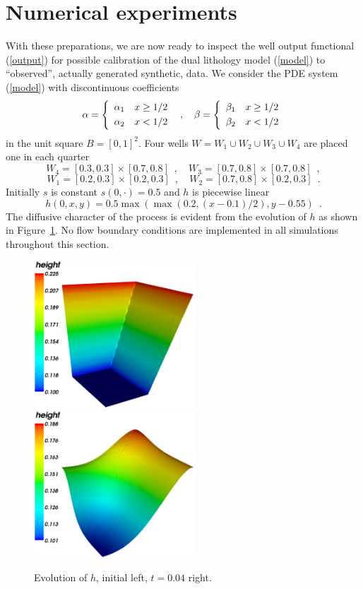 \section{Numerical experiments}

With these preparations, we are now ready to inspect the well output functional (\ref{output})
for possible calibration of the dual lithology model (\ref{model}) to ``observed'',
actually generated synthetic, data.
We consider the PDE system (\ref{model}) with discontinuous coefficients
$$
 \alpha = \left\{
 \begin{array}{rl} \alpha_1 & x \ge 1/2 \\[\jot] \alpha_2 & x < 1/2 \end{array}
 \right .
 \enspace , \quad
 \beta = \left\{
 \begin{array}{rl} \beta_1 & x \ge 1/2 \\[\jot] \beta_2 & x < 1/2 \end{array}
 \right .
$$
in the unit square $B=[0,1]^2$.
Four wells $W = W_1 \cup W_2 \cup W_3 \cup W_4$
are placed one in each quarter
$$
 W_4 = [0.3, 0.3] \times [0.7, 0.8] \enspace, \quad
 W_3 = [0.7, 0.8] \times [0.7, 0.8] \enspace,
$$
$$
 W_1 = [0.2, 0.3] \times [0.2, 0.3] \enspace, \quad
 W_2 = [0.7, 0.8] \times [0.2, 0.3] \enspace.
$$
Initially $s$ is constant $s(0,\cdot)=0.5$ and $h$ is piecewise linear
$$
 h(0,x,y) = 0.5 \max(\max(0.2, (x-0.1)/2), y-0.55) \enspace .
$$
The diffusive character of the process is evident from the evolution of $h$ as shown in Figure~\ref{fig1}.
No flow boundary conditions are implemented in all simulations throughout this section.
\begin{figure}
  \begin{center}
    \includegraphics[width=6cm]{chapters/schroll/eps/h0_typical.eps}
    \includegraphics[width=6cm]{chapters/schroll/eps/h_typical.eps}
  \end{center}
    \caption{Evolution of $h$, initial left, $t=0.04$ right.  \label{fig1}}
\end{figure}

